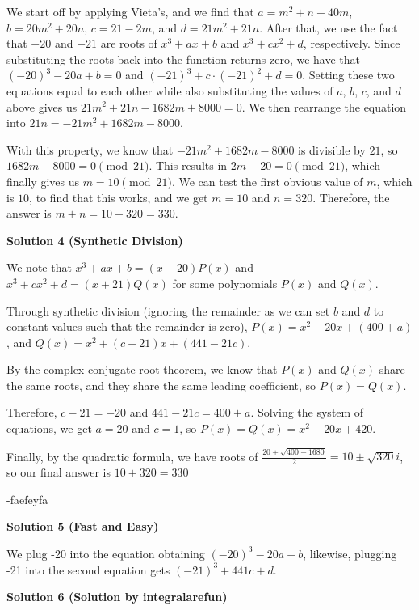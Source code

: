 \begin{enumerate}
We start off by applying Vieta's, and we find that $a=m^2+n-40m$, $b=20m^2+20n$, $c=21-2m$, and $d=21m^2+21n$. After that, we use the fact that $-20$ and $-21$ are roots of $x^3+ax+b$ and $x^3+cx^2+d$, respectively. Since substituting the roots back into the function returns zero, we have that $(-20)^3-20a+b=0$ and $(-21)^3+c\cdot (-21)^2+d=0$. Setting these two equations equal to each other while also substituting the values of $a$, $b$, $c$, and $d$ above gives us $21m^2+21n-1682m+8000=0$. We then rearrange the equation into $21n = -21m^2+1682m-8000$.

 With this property, we know that $-21m^2+1682m-8000$ is divisible by $21$, so $1682m-8000=0 \pmod{21}$. This results in $2m-20=0 \pmod{21}$, which finally gives us $m=10 \pmod{21}$. We can test the first obvious value of $m$, which is $10$, to find that this works, and we get $m=10$ and $n=320$. Therefore, the answer is $m + n = 10 + 320 = \boxed{330}.$




\textbf{Solution 4 (Synthetic Division)}

We note that $x^3 + ax + b = (x+20)P(x)$ and $x^3 + cx^2 + d = (x+21)Q(x)$ for some polynomials $P(x)$ and $Q(x)$.

 Through synthetic division (ignoring the remainder as we can set $b$ and $d$ to constant values such that the remainder is zero), $P(x) = x^2 - 20x + (400+a)$, and $Q(x) = x^2 + (c-21)x + (441 - 21c)$.

 By the complex conjugate root theorem, we know that $P(x)$ and $Q(x)$ share the same roots, and they share the same leading coefficient, so $P(x) = Q(x)$. 

 Therefore, $c-21 = -20$ and $441-21c = 400 + a$. Solving the system of equations, we get $a = 20$ and $c = 1$, so $P(x) = Q(x) = x^2 - 20x + 420$.

 Finally, by the quadratic formula, we have roots of $\frac{20 \pm \sqrt{400 - 1680}}{2} = 10 \pm \sqrt{320}i$, so our final answer is $10 + 320 = \boxed{330}$

 -faefeyfa

 



\textbf{Solution 5 (Fast and Easy)}

We plug -20 into the equation obtaining $(-20)^3-20a+b$, likewise, plugging -21 into the second equation gets $(-21)^3+441c+d$.

 



\textbf{Solution 6 (Solution by integralarefun)}


\end{enumerate}
